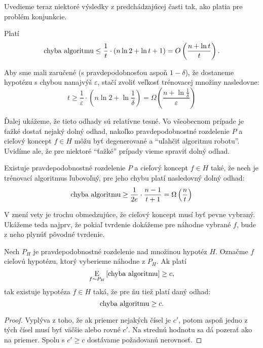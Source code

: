 Uvedieme teraz niektoré výsledky z predchádzajúcej časti tak, ako platia
pre problém konjunkcie.

\begin{corollary}
  Platí
  $$ \text{\normalfont chyba algoritmu} \leq \frac{1}{t} \cdot \left( n \ln{2} + \ln{t} + 1 \right) = O\left( \frac{n + \ln{t}}{t} \right). $$
\end{corollary}
\begin{corollary} \label{cor:mconj_de}
  Aby sme mali zaručené (s pravdepodobnosťou aspoň $1 - \delta$), že
  dostaneme hypotézu s chybou nanajvýš $\varepsilon$, stačí zvoliť
  veľkosť trénovacej množiny nasledovne:
  $$ t \geq \frac{1}{\varepsilon} \cdot \left( n \ln{2} + \ln{\frac{1}{\delta}} \right) = \Omega\left( \frac{n + \ln{\frac{1}{\delta}}}{\varepsilon} \right) $$
\end{corollary}

Ďalej ukážeme, že tieto odhady sú relatívne tesné. Vo všeobecnom prípade
je ťažké dostať nejaký dolný odhad, nakoľko pravdepodobnostné rozdelenie
$P$ a cieľový koncept $f \in H$ môžu byť degenerované a ``uľahčiť algoritmu
robotu''. Uvidíme ale, že pre niektoré ``ťažké'' prípady vieme spraviť
dolný odhad.

\begin{theorem} \label{thm:mconj_lb}
  Existuje pravdepodobnostné rozdelenie $P$ a cieľový koncept $f \in H$
  také, že nech je trénovací algoritmus ľubovoľný, pre jeho chybu platí
  nasledovný dolný odhad:
  $$ \text{\normalfont chyba algoritmu} \geq \frac{1}{2e} \cdot \frac{n-1}{t+1} = \Omega \left( \frac{n}{t} \right)$$
\end{theorem}

V znení vety je trochu obmedzujúce, že cieľový koncept musí byť
pevne vybraný. Ukážeme teda najprv, že pokiaľ tvrdenie dokážeme
pre náhodne vybrané $f$, bude z neho plynúť pôvodné tvrdenie.

\begin{lemma}
  Nech $P_H$ je pravdepodobnostné rozdelenie nad množinou hypotéz $H$.
  Označme $f$ cieľovú hypotézu, ktorý vyberieme náhodne z $P_H$. Ak platí
  $$\operatorname*{\mathrm{E}}_{f \sim P_H} \left[ \text{\normalfont chyba algoritmu} \right] \geq c,$$
  tak existuje hypotéza $f \in H$ taká, že pre ňu tiež platí daný odhad:
  $$ \text{\normalfont chyba algoritmu} \geq c. $$
\end{lemma}
\begin{proof}
  Vyplýva z toho, že ak priemer nejakých čísel je $c'$, potom aspoň jedno
  z tých čísel musí byť väčšie alebo rovné $c'$. Na strednú hodnotu sa
  dá pozerať ako na priemer. Spolu s $c' \geq c$ dostávame požadovanú
  nerovnosť.
\end{proof}

